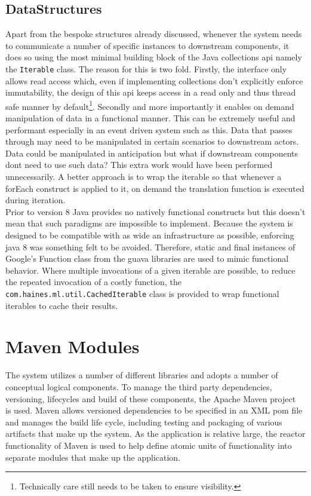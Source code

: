 \documentclass[a4paper,11pt]{scrreprt}
\begin{document}
\subsection{DataStructures}
Apart from the bespoke structures already discussed, whenever the system needs to communicate a number of specific instances to downstream components, it does so using the most minimal building block of the Java collections \acrshort{api} namely the \verb|Iterable| class. The reason for this is two fold. Firstly, the interface only allows read access which, even if implementing collections don't explicitly enforce immutability, the design of this \acrshort{api} keeps access in a read only and thus thread safe manner by default\footnote{Technically care still needs to be taken to ensure visibility.}. Secondly and more importantly it enables on demand manipulation of data in a functional manner. This can be extremely useful and performant especially in an event driven system such as this. Data that passes through may need to be manipulated in certain scenarios to downstream actors. Data could be manipulated in anticipation but what if downstream components dont need to use such data? This extra work would have been performed unnecessarily. A better approach is to wrap the iterable so that whenever a forEach construct is applied to it, on demand the translation function is executed during iteration. \\
Prior to version 8 Java provides no natively functional constructs but this doesn't mean that such paradigms are impossible to implement. Because the system is designed to be compatible with as wide an infrastructure as possible, enforcing java 8 was something felt to be avoided. Therefore, static and final instances of Google's Function class from the guava libraries are used to mimic functional behavior. Where multiple invocations of a given iterable are possible, to reduce the repeated invocation of a costly function, the \verb|com.haines.ml.util.CachedIterable| class is provided to wrap functional iterables to cache their results.

\section{Maven Modules}
The system utilizes a number of different libraries and adopts a number of conceptual logical components. To manage the third party dependencies, versioning, lifecycles and build of these components, the Apache Maven project~\cite{maven} is used. Maven allows versioned dependencies to be specified in an XML pom file and manages the build life cycle, including testing and packaging of various artifacts that make up the system. As the application is relative large, the reactor functionality of Maven is used to help define atomic units of functionality into separate modules that make up the application. 
\end{document}
